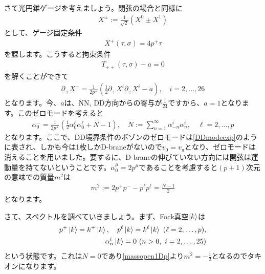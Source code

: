 \documentclass[report,paper=a4, fontsize=12pt, line_length=16cm, number_of_lines=34,dvipdfmx]{jlreq}
\numberwithin{equation}{chapter}
\numberwithin{equation}{section}
\newcommand{\del}{\partial}
\begin{document}
さて光円錐ゲージを考えましょう。閉弦の場合と同様に
\begin{align}
  X^{\pm}:=\frac{1}{\sqrt{2}}(X^{0}\pm X^{1})
\end{align}
として、ゲージ固定条件
\begin{align}
  X^{+}(\tau,\sigma)=4p^{+}\tau
\end{align}
を課します。こうすると拘束条件
\begin{align}
  T_{++}(\tau,\sigma)-a=0
\end{align}
を解くことができて
\begin{align}
  \del_{+}X^{-}=\frac{1}{2p^{+}}\left( \frac12 \del_{+}X^{i}\del_{+}X^{i}-a \right),\quad i=2,\dots,26
\end{align}
となります。今、$a$は、NN, DD方向からの寄与が$\frac{1}{24}$ですから、$a=1$となります。このゼロモードを考えると
\begin{align}
  \alpha^{-}_{0}=\frac{1}{2p^{+}}\left( \frac12 \alpha_{0}^{\ell}\alpha_{0}^{\ell}+N-1 \right),\quad N:=\sum_{n=1}^{\infty} \alpha_{-n}^{i}\alpha_{n}^{i},\quad \ell=2,\dots,p\label{singlebranezeromode}
\end{align}
となります。ここで、DD境界条件のボゾンのゼロモードは\eqref{DDmodeexp}のように表され、しかも今は1枚しかD-braneがないので$v_0=v_{\pi}$となり、ゼロモードは消えることを用いました。要するに、D-braneの伸びていない方向には開弦は運動量を持てないということです。$\alpha^{\mu}_{0}=2p^{\mu}$であることを考慮すると$(p+1)$次元の意味での質量$m^2$は
\begin{align}
  m^2:=2p^{+}p^{-}-p^{\ell}p^{\ell}=\frac{N-1}{2}\label{massopen1Dp}
\end{align}
となります。

さて、スペクトルを調べていきましょう。まず、Fock真空$\ket{k}$は
\begin{align}
  p^{+}\ket{k}=k^{+}\ket{k},\quad
  p^{\ell}\ket{k}=k^{\ell}\ket{k}\ (\ell=2,\dots,p),\nonumber\\
 \alpha_{n}^{i}\ket{k}=0\ (n>0,\ i=2,\dots,25)
\end{align}
という状態です。これは$N=0$であり\eqref{massopen1Dp}より$m^2=-\frac12$となるのでタキオンになります。
\end{document}
